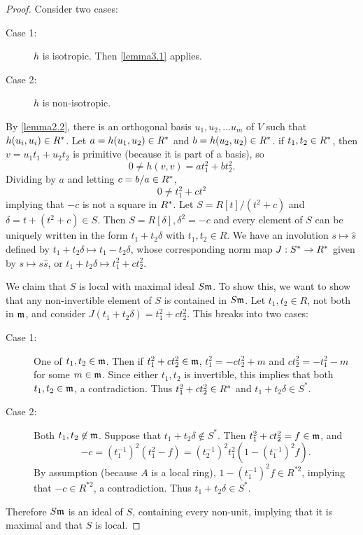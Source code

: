 \begin{proof}
Consider two cases:
\begin{description}
\item[Case 1:] $h$ is isotropic. Then \ref{lemma3.1} applies.
\item[Case 2:] $h$ is non-isotropic.
\end{description}
By \cref{lemma2.2}, %
there is an orthogonal basis $u_1, u_2, \dotsc u_m$ of $V$ such that $h(u_i, u_i) \in R^*$.
Let $a = h(u_1, u_2) \in R^*$ and $b = h(u_2, u_2) \in R^*$.
if $t_1, t_2 \in R^*$, then $v = u_1 t_1 + u_2 t_2$ is primitive (because it is part of a basis),
so
\[
0 \ne h(v, v) = a t_1^2 + b t_2^2.
\]
Dividing by $a$ and letting $c = b/a \in R^*$,
\[
0 \ne t_1^2 + ct^2
\]
implying that $-c$ is not a square in $R^*$.
Let $S = R[t] / (t^2 + c)$ and $\delta = t + (t^2 + c) \in S$.
Then $S = R[\delta], \delta^2 = -c$ and every element of $S$ can be uniquely written in the form $t_1 + t_2 \delta$ with $t_1, t_2 \in R$.
We have an involution $s \mapsto \hat{s}$ defined by $t_1 + t_2 \delta \mapsto t_1 - t_2 \delta$,
whose corresponding norm map $J: S^* \to R^*$ given by $s \mapsto s \hat{s}$, or $t_1 + t_2 \delta \mapsto t_1^2 + c t_2^2$.

We claim that $S$ is local with maximal ideal $S\mathfrak{m}$.
To show this, we want to show that any non-invertible element of $S$ is contained in $S\mathfrak{m}$.
Let $t_1, t_2 \in R$, not both in $\mathfrak{m}$, and consider $J(t_1 + t_2 \delta) = t_1^2 + c t_2^2$.
This breaks into two cases:
\begin{description}
\item[Case 1:] One of $t_1, t_2 \in \mathfrak{m}$.
Then if $t_1^2 + ct_2^2 \in \mathfrak{m}$, $t_1^2 = -ct_2^2 + m$ and $ct_2^2 = -t_1^2 - m$ for some $m \in \mathfrak{m}$.
Since either $t_1, t_2$ is invertible, this implies that both $t_1, t_2 \in \mathfrak{m}$, a contradiction.
Thus $t_1^2 + c t_2^2 \in R^*$ and $t_1 + t_2 \delta \in S^*$.
\item[Case 2:] Both $t_1, t_2 \not\in \mathfrak{m}$. 
Suppose that $t_1 + t_2 \delta \not \in S^*$.
Then $t_1^2 + ct_2^2 = f \in \mathfrak{m}$, and
\[
-c = (t_1^{-1})^2(t_1^2 - f) = (t_2^{-1})^2 t_1^2(1 - (t_1^{-1})^2f).
\]
By assumption (because $A$ is a local ring), $1 - (t_1^{-1})^2 f \in R^{*2}$, implying that $-c \in R^{*2}$, a contradiction.
Thus $t_1 + t_2 \delta \in S^*$.
\end{description}
Therefore $S\mathfrak{m}$ is an ideal of $S$, containing every non-unit, implying that it is maximal and that $S$ is local.


\end{proof}
